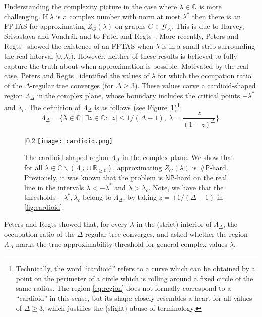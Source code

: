 \documentclass[11pt]{article}
\def\NP{\mathsf{NP}}
\def\numP{\#\mathsf{P}}
\def\Reals{\mathbb{R}}
\def\Complex{\mathbb{C}}
\def\LambdaD{\Lambda_\Delta}
\begin{document}
Understanding the complexity picture in the case where $\lambda\in\Complex$ is more challenging.  
If $\lambda$ is a complex number with norm at most $\lambda^*$ 
then there is an FPTAS for
approximating $Z_G(\lambda)$  on graphs $G\in \mathcal{G}_\Delta$.
This is due to Harvey, Srivastava and Vondr{\'a}k
and to Patel and Regts~\cite{Piyush,PR}. 
More recently, Peters and Regts~\cite{Peters} showed the existence of an FPTAS when $\lambda$ is in a small strip surrounding the real interval $[0,\lambda_c)$.
However, neither of these results is believed to fully capture the truth about
when approximation is possible.  
Motivated by the real case, Peters and Regts~\cite{Peters} identified the values of $\lambda$ for which 
the occupation  ratio of the $\Delta$-regular tree converges (for $\Delta \geq 3$). These values carve a cardioid-shaped region $\LambdaD$ 
in the complex plane, whose boundary
  includes the critical points $-\lambda^*$ and $\lambda_c$.
  The definition of $\LambdaD$ is as follows  
       (see Figure~\ref{fig:cardioid})\footnote{Technically, the word ``cardioid'' refers to a curve which can be obtained by a point on the perimeter of a circle which is rolling around a fixed circle of the same radius. The region \eqref{eq:region} does not formally correspond to a ``cardioid'' in this sense, but its shape closely resembles a heart for all values of $\Delta\geq 3$, which justifies the (slight) abuse of terminology.}:
\begin{equation}\label{eq:region}
\LambdaD=\Big\{\lambda \in \mathbb{C}\,\Big|\,\exists z\in \Complex:\ |z|\leq 1/(\Delta-1),\ \lambda=\frac{z}{(1-z)^{\Delta}}\Big\}.
\end{equation}%
\begin{figure}[h]
\begin{center}
\scalebox{0.2}[0.2]{\texttt{[image: cardioid.png]}}
\end{center}
\caption{\label{fig:cardioid}The cardioid-shaped region $\LambdaD$ in the complex plane. We show that for all $\lambda\in \Complex\backslash (\LambdaD\cup \Reals_{\geq 0})$, approximating $Z_G(\lambda)$ is $\numP$-hard. Previously, it was known that the problem is $\NP$-hard on the real line in the intervals $\lambda<-\lambda^*$ and $\lambda>\lambda_c$. Note, we have  that the thresholds $-\lambda^*,\lambda_c$ belong to $\LambdaD$, by taking $z=\pm 1/(\Delta-1)$ in \eqref{fig:cardioid}.}
\end{figure}%
Peters and Regts showed that, for every $\lambda$ in the (strict) interior of $\LambdaD$, the occupation ratio of the $\Delta$-regular tree converges, and asked whether the region $\LambdaD$ marks the true approximability threshold for general complex values $\lambda$. 
\end{document}
